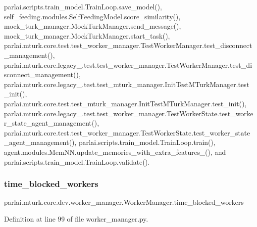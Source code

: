 parlai.\+scripts.\+train\+\_\+model.\+Train\+Loop.\+save\+\_\+model(), self\+\_\+feeding.\+modules.\+Self\+Feeding\+Model.\+score\+\_\+similarity(), mock\+\_\+turk\+\_\+manager.\+Mock\+Turk\+Manager.\+send\+\_\+message(), mock\+\_\+turk\+\_\+manager.\+Mock\+Turk\+Manager.\+start\+\_\+task(), parlai.\+mturk.\+core.\+test.\+test\+\_\+worker\+\_\+manager.\+Test\+Worker\+Manager.\+test\+\_\+disconnect\+\_\+management(), parlai.\+mturk.\+core.\+legacy\+\_.\+test.\+test\+\_\+worker\+\_\+manager.\+Test\+Worker\+Manager.\+test\+\_\+disconnect\+\_\+management(), parlai.\+mturk.\+core.\+legacy\+\_.\+test.\+test\+\_\+mturk\+\_\+manager.\+Init\+Test\+M\+Turk\+Manager.\+test\+\_\+init(), parlai.\+mturk.\+core.\+test.\+test\+\_\+mturk\+\_\+manager.\+Init\+Test\+M\+Turk\+Manager.\+test\+\_\+init(), parlai.\+mturk.\+core.\+legacy\+\_.\+test.\+test\+\_\+worker\+\_\+manager.\+Test\+Worker\+State.\+test\+\_\+worker\+\_\+state\+\_\+agent\+\_\+management(), parlai.\+mturk.\+core.\+test.\+test\+\_\+worker\+\_\+manager.\+Test\+Worker\+State.\+test\+\_\+worker\+\_\+state\+\_\+agent\+\_\+management(), parlai.\+scripts.\+train\+\_\+model.\+Train\+Loop.\+train(), agent.\+modules.\+Mem\+N\+N.\+update\+\_\+memories\+\_\+with\+\_\+extra\+\_\+features\+\_\+(), and parlai.\+scripts.\+train\+\_\+model.\+Train\+Loop.\+validate().

\mbox{\label{classparlai_1_1mturk_1_1core_1_1dev_1_1worker__manager_1_1WorkerManager_a91e52a07f116d045069678e1b634ebeb}} 
\subsubsection{\texorpdfstring{time\+\_\+blocked\+\_\+workers}{time\_blocked\_workers}}
{\footnotesize\ttfamily parlai.\+mturk.\+core.\+dev.\+worker\+\_\+manager.\+Worker\+Manager.\+time\+\_\+blocked\+\_\+workers}



Definition at line 99 of file worker\+\_\+manager.\+py.



